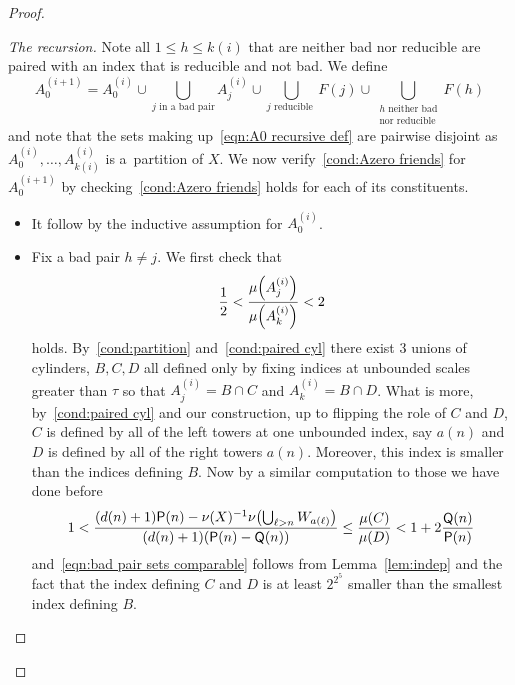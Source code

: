 \documentclass[10pt]{amsart}
\theoremstyle{definition}\newtheorem{defi}[theo]{Definition}\newtheorem{rema}[theo]{Remark}\newtheorem{exam}[theo]{Example}\newtheorem{exem}[theo]{Example}\newtheorem{nota}[theo]{Notation}
\DeclareMathOperator{\Q}{\mathsf{Q}}
\renewcommand{\P}{\mathsf{P}}
\let\originalleft\left
\let\originalright\right
\renewcommand{\left}{\mathopen{}\mathclose\bgroup\originalleft}
\renewcommand{\right}{\aftergroup\egroup\originalright}
\begin{document}
\begin{proof}
\begin{proof}[{The recursion}]
Note all $1 \le h \le k(i)$ that are neither bad nor reducible are paired with an index that is reducible and not bad. We define
\begin{equation}\label{eqn:A0 recursive def}
A_0^{(i+1)} = A_0^{(i)}
\cup
\bigcup_{j \text{ in a bad pair}} A_j^{(i)}
\cup
\bigcup_{j \text{ reducible }} F(j)
\cup
\bigcup_{\substack{h\text{ neither bad}\\\text{nor reducible}}} F(h)
\end{equation}
and note that the sets making up~\eqref{eqn:A0 recursive def} are pairwise disjoint as $A^{(i)}_0,\dots,A^{(i)}_{k(i)}$ is a~partition of $X$. We now verify~\eqref{cond:Azero friends} for $A^{(i+1)}_0$ by checking~\eqref{cond:Azero friends} holds for each of its constituents.
\begin{itemize}
\item It follow by the inductive assumption for $A_0^{(i)}$.
\item Fix a bad pair $h \ne j$. We first check that
\begin{equation}\label{eqn:bad pair sets comparable}
\frac{1}{2} < \frac{\mu\left(A^{(i)}_j\right)}{\mu\left(A^{(i)}_k\right)} < 2
\end{equation}
holds. By~\eqref{cond:partition} and~\eqref{cond:paired cyl} there exist 3 unions of cylinders, $B,C,D$ all defined only by fixing indices at unbounded scales greater than $\tau$ so that $A_j^{(i)}=B \cap C$ and $A_k^{(i)}=B \cap D$. What is more, by~\eqref{cond:paired cyl} and our construction, up to flipping the role of $C$ and $D$, $C$ is defined by all of the left towers at one unbounded index, say $a(n)$ and $D$ is defined by all of the right towers $a(n)$. Moreover, this index is smaller than the indices defining $B$. Now by a similar computation to those we have done before
\[
1 < \frac{(d(n)+1)\P(n)-\nu(X)^{-1}\nu\left(\bigcup_{\ell>n}W_{a(\ell)}\right)}{(d(n)+1)(\P(n)-\Q(n))}\leq \frac{\mu(C)}{\mu(D)}<1+2\frac{\Q(n)}{\P(n)}
\]
and~\eqref{eqn:bad pair sets comparable} follows from Lemma~\ref{lem:indep} and the fact that the index defining $C$ and $D$ is at least $2^{2^5}$ smaller than the smallest index defining $B$.


\end{itemize}
\end{proof}
\end{proof}
\end{document}
